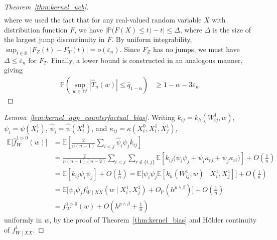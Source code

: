 \documentclass[11pt,lof]{puthesis}
\renewcommand{\P}{\ensuremath{\mathbb{P}}}
\newcommand{\R}{\ensuremath{\mathbb{R}}}
\newcommand{\E}{\ensuremath{\mathbb{E}}}
\newcommand{\cW}{\ensuremath{\mathcal{W}}}
\theoremstyle{break}
\theoremstyle{proof}
\newtheorem{proof}{Proof}
\begin{document}
\begin{proof}[Theorem~\ref{thm:kernel_ucb}]
\begin{align*}
  \end{align*}
  where we used the fact that for any
  real-valued random variable $X$ with distribution function $F$,
  we have
  $\big|\P\big(F(X) \leq t\big) - t\big| \leq \Delta$,
  where $\Delta$ is the size of the
  largest jump discontinuity in $F$.
  By uniform integrability,
  $\sup_{t \in \R} \big| F_Z(t) - F_T(t) \big| = o(\varepsilon_n)$.
  Since $F_Z$ has no jumps,
  we must have $\Delta \leq \varepsilon_n$ for $F_T$.
  Finally, a lower bound is constructed in an analogous manner,
  giving
  \begin{align*}
    \P\left(
      \sup_{w \in \cW}
      \left| \hat T_n(w) \right|
      \leq
      \hat q_{1-\alpha}
    \right)
    &\geq
    1 - \alpha - 3\varepsilon_n.
  \end{align*}
\end{proof}

\begin{proof}[Lemma~\ref{lem:kernel_app_counterfactual_bias}]

  Writing $k_{i j} = k_h(W_{i j}^1, w)$, $\psi_i = \psi(X_i^1)$, $\hat\psi_i =
  \hat\psi(X_i^1)$, and $\kappa_{i j} = \kappa(X_i^0, X_i^1, X_j^1)$,
  \begin{align*}
    \E\big[\hat f_W^{1 \triangleright 0}(w)\big]
    &=
    \E\left[
      \frac{2}{n(n-1)}
      \sum_{i<j}
      \hat \psi_i
      \hat \psi_j
      k_{i j}
    \right] \\
    &=
    \frac{2}{n(n-1)(n-2)}
    \sum_{i < j}
    \sum_{r \notin \{i,j\}}
    \E\left[
      k_{i j}
      \Big(
        \psi_i
        \psi_j
        +\psi_i
        \kappa_{r j}
        +\psi_j
        \kappa_{r i}
      \Big)
    \right]
    + O\left(\frac{1}{n}\right) \\
    &=
    \E\left[
      k_{i j}
      \psi_i
      \psi_j
    \right]
    + O\left(\frac{1}{n}\right)
    =
    \E\big[
      \psi_i
      \psi_j
      \E\left[
        k_h(W_{i j}^1, w)
        \mid X_i^1, X_j^1
      \right]
    \big]
    + O\left(\frac{1}{n}\right) \\
    &=
    \E\big[
      \psi_i
      \psi_j
      f_{W \mid XX}^1(w \mid X_i^1, X_j^1)
      + O_\P\left( h^{p \wedge \beta} \right)
    \big]
    + O\left(\frac{1}{n}\right) \\
    &=
    f_W^{1 \triangleright 0}(w)
    + O\left( h^{p \wedge \beta} + \frac{1}{n}\right)
  \end{align*}
  uniformly in $w$, by the proof of
  Theorem~\ref{thm:kernel_bias} and H{\"o}lder continuity
  of $f_{W \mid XX}^1$.
\end{proof}
\end{document}
